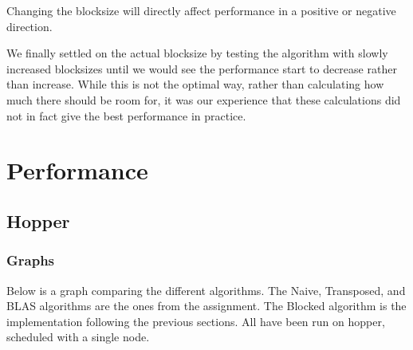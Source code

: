 \documentclass[a4paper,11pt,oneside]{book}
\begin{document}
Changing the blocksize will directly affect performance in a positive or negative
direction.

We finally settled on the actual blocksize by testing the algorithm with
slowly increased blocksizes until we would see the performance start to decrease 
rather than increase. While this is not the optimal way, rather than calculating
how much there should be room for, it was our experience that these calculations
did not in fact give the best performance in practice.

\chapter{Performance}


\section{Hopper}
\subsection{Graphs}


Below is a graph comparing the different algorithms. The Naive, Transposed, and BLAS algorithms are the ones from the assignment. The Blocked algorithm is the implementation following the previous sections. All have been run on hopper, scheduled with a single node.
\end{document}
